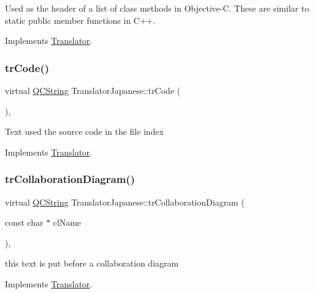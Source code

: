 Used as the header of a list of class methods in Objective-\/C. These are similar to static public member functions in C++. 

Implements \mbox{\hyperlink{class_translator}{Translator}}.

\mbox{\label{class_translator_japanese_a430df42a03c1679e583994d57c7c0962}} 
\subsubsection{\texorpdfstring{trCode()}{trCode()}}
{\footnotesize\ttfamily virtual \mbox{\hyperlink{class_q_c_string}{Q\+C\+String}} Translator\+Japanese\+::tr\+Code (\begin{DoxyParamCaption}{ }\end{DoxyParamCaption})\hspace{0.3cm}{\ttfamily [inline]}, {\ttfamily [virtual]}}

Text used the source code in the file index 

Implements \mbox{\hyperlink{class_translator}{Translator}}.

\mbox{\label{class_translator_japanese_ac4cd190f2bc3f4fbf989a9ef0108ad2d}} 
\subsubsection{\texorpdfstring{trCollaborationDiagram()}{trCollaborationDiagram()}}
{\footnotesize\ttfamily virtual \mbox{\hyperlink{class_q_c_string}{Q\+C\+String}} Translator\+Japanese\+::tr\+Collaboration\+Diagram (\begin{DoxyParamCaption}\item[{const char $\ast$}]{cl\+Name }\end{DoxyParamCaption})\hspace{0.3cm}{\ttfamily [inline]}, {\ttfamily [virtual]}}

this text is put before a collaboration diagram 

Implements \mbox{\hyperlink{class_translator}{Translator}}.

\mbox{\label{class_translator_japanese_a8c73341c674393f0eee9ce844e4d3e77}} 
